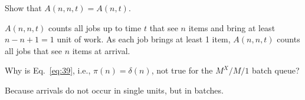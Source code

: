 \begin{question}
   Show that $A(n, n,t) = A(n,t)$. 
\begin{solution}
 $A(n,n,t)$ counts all jobs up to time $t$ that see $n$ items
    and bring at least $n-n+1=1$ unit of work. As each job brings at
    least 1 item, $A(n,n,t)$ counts all jobs that see $n$ items at
    arrival.
\end{solution}
\end{question}

\begin{question}
  Why is Eq.~\eqref{eq:39}, i.e., $\pi(n)=\delta(n)$, not true for the
  $M^X/M/1$ batch queue?
\begin{solution}
 Because arrivals do not occur in single units, but in batches.
\end{solution}
\end{question}

